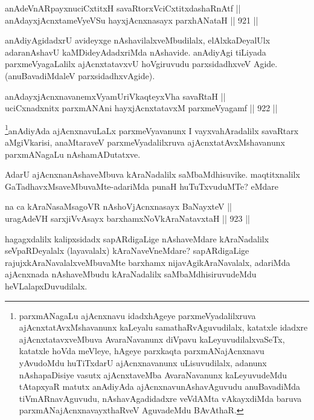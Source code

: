 \begin{shl}
anAdeVnARpayxnuciCxtitxH savaRtorxVciCxtitxdashaRnAtf || \\
anAdayxjAcnxtameVyeVSu hayxjAcnxnasayx parxhANataH \hfill || 921 ||  
\end{shl}

\begin{artha}
anAdiyAgidadxrU avideyxge nAshavilalxveMbudilalx, elAlxkaDeyalUlx adaranAshavU kaMDideyAdadxriMda nAshavide. anAdiyAgi tiLiyada parxmeVyagaLalilx ajAcnxtatavxvU hoVgiruvudu parxsidadhxveV Agide.(anuBavadiMdaleV parxsidadhxvAgide).
\end{artha}


\begin{shl}
anAdayxjAcnxnavanemxVyamUriVkaqteyxVha savaRtaH || \\
uciCxnadxnitx parxmANAni hayxjAcnxtatavxM parxmeVyagamf \hfill || 922 ||  
\end{shl}

\begin{artha}
\footnote{parxmANagaLu ajAcnxnavu idadxhAgeye parxmeVyadalilxruva ajAcnxtatAvxMshavanunx kaLeyalu samathaRvAguvudilalx, katatxle idadxre ajAcnxtatavxveMbuva AvaraNavanunx diVpavu kaLeyuvudilalxvaSeTx, katatxle hoVda meVleye, hAgeye parxkaqta parxmANajAcnxnavu yAvudoMdu huTiTxdarU ajAcnxnavanunx uLisuvudilalx, adanunx nAshapaDisiye vasutx ajAcnxtaveMba AvaraNavanunx kaLeyuvudeMdu tAtapxyaR matutx anAdiyAda ajAcnxnavunAshavAguvudu anuBavadiMda tiVmARnavAguvudu, nAshavAgadidadxre veVdAMta vAkayxdiMda baruva parxmANajAcnxnavayxthaRveV AguvadeMdu BAvAthaR.}anAdiyAda ajAcnxnavuLaLx parxmeVyavanunx I vayxvahAradalilx savaRtarx aMgiVkarisi, anaMtaraveV parxmeVyadalilxruva ajAcnxtatAvxMshavanunx parxmANagaLu nAshamADutatxve.
\end{artha}

\begin{artha}
AdarU ajAcnxnanAshaveMbuva kAraNadalilx saMbaMdhisuvike. maqtitxnalilx GaTadhavxMsaveMbuvaMte-adariMda punaH huTuTxvuduMTe? eMdare\ndash 
\end{artha}

\begin{shl}
na ca kAraNasaMsagoVR nAshoV\s jAcnxnasayx BaNayxteV || \\
uragAdeVH sarxjiVvAsayx barxhamxNoV\s kAraNatavxtaH \hfill || 923 ||  
\end{shl}

\begin{artha}
hagagxdalilx kalipxsidadx sapARdigaLige nAshaveMdare kAraNadalilx seVpaRDeyalalx (layavalalx) kAraNaveVneMdare? sapARdigaLige rajujxkAraNavalalxveMbuvaMte barxhamx nijavAgikAraNavalalx, adariMda ajAcnxnada nAshaveMbudu kAraNadalilx saMbaMdhisiruvudeMdu heVLalapxDuvudilalx.
\end{artha}

